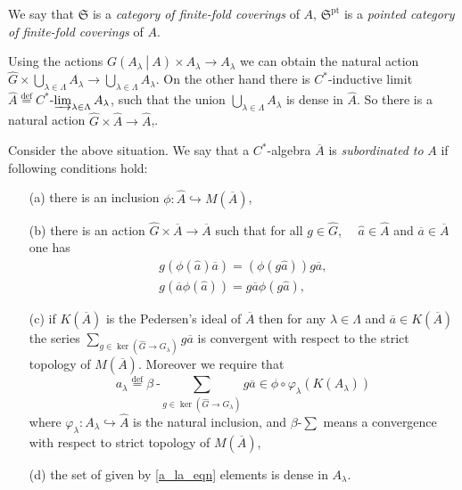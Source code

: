 \documentclass{beamer}
\theoremstyle{plain}
\newcommand{\be}{\begin{equation}}
\newcommand{\ee}{\end{equation}}
\newcommand{\la}{\lambda}
\newcommand{\La}{\Lambda}
\newcommand{\bt}{\beta}           %
\newcommand{\bydef}{\stackrel{\mathrm{def}}{=}}
\newcommand{\hookto}{\hookrightarrow}        %
\begin{document}
\begin{frame}
	\begin{definition}
		We say that $\mathfrak{S}$ is a \textit{category of finite-fold coverings} of $A$, $\mathfrak{S}^{\text{pt}}$ is a \textit{pointed category of finite-fold coverings} of $A$.
	\end{definition}
Using the actions  $G\left(\left.A_\la~\right|~A\right)\times A_\la \to A_\la$ we can obtain  the natural action $\widehat{G}\times \bigcup_{\la\in \La} A_\la \to  \bigcup_{\la\in \La} A_\la$. On the other hand there is $C^*$-inductive limit $\widehat A \bydef C^*$-$\varinjlim_{\la\in \La} A_\la$, such that the union $\bigcup_{\la\in \La} A_\la$ is dense in $\widehat A$. So there is a natural action $\widehat{G} \times \widehat{A}\to \widehat{A}$,.
\end{frame}
\begin{frame}
	Consider the above situation.  We say that a $C^*$-algebra $\overline A$ is \textit{ subordinated to}  $A$ if following conditions hold:
	\begin{enumerate}
		\item [(a)] there is an inclusion $\phi: \widehat A \hookto M\left(\overline A\right)$,
		\item[(b)] there is an action $\widehat{G}\times \overline A \to \overline A$ such that
		for all $g \in \widehat{G}$,  $\quad \widehat a \in \widehat{A}$ and $\overline a \in \overline{A}$ one has
		\be\label{subord_ga_eqn}
		\begin{split}
			g\left(\phi\left(\widehat a \right)\overline{a}\right)  = 	\left(\phi\left(g\widehat a \right)\right) g \overline{a},\\
			g\left( \overline{a}\phi\left(\widehat a \right)\right) =g \overline{a}\phi\left(g\widehat a \right),
		\end{split}
		\ee
		\item[(c)] if $K\left( \overline{A}\right)$ is the Pedersen's ideal of $\overline A$ then   for any $\la\in \La$  and $\overline a \in K\left( \overline{A}\right)$ the series $\sum_{g \in \ker\left(\widehat{G}\to G_\la\right)}g \overline a$ is convergent with respect to the strict topology of $M\left(\overline{A} \right)$. Moreover we require that
		\be\label{a_la_eqn}
		a_\la \bydef 	\bt~\text{-}\sum_{g \in \ker\left(\widehat{G}\to G_\la\right)}g \overline a \in \phi\circ \varphi_\la\left( K\left( A_\la\right) \right) 	
		\ee
		where $\varphi_\la : A_\la \hookto \widehat A$ is the natural inclusion, and $\bt$-$\sum$ means a convergence with respect to strict topology of $M\left( \overline A\right)$,
		\item[(d)] the set of given by \eqref{a_la_eqn} elements is dense in $A_\la$.
	\end{enumerate}

\end{frame}
\end{document}
